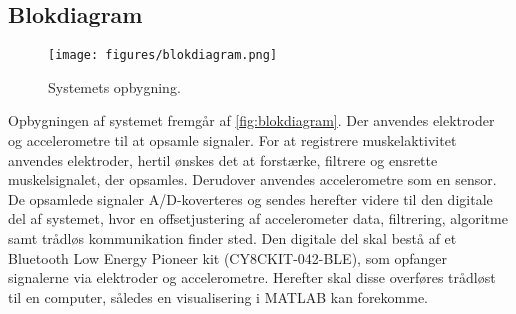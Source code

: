 \subsection{Blokdiagram} \label{sec:blokdiagram} 
\begin{figure}[H]
\centering
\texttt{[image: figures/blokdiagram.png]}
\caption{Systemets opbygning.}
\label{fig:blokdiagram}
\end{figure}

\noindent
Opbygningen af systemet fremgår af \autoref{fig:blokdiagram}. Der anvendes elektroder og accelerometre til at opsamle signaler. 
For at registrere muskelaktivitet anvendes elektroder, hertil ønskes det at forstærke, filtrere og ensrette muskelsignalet, der opsamles. 
Derudover anvendes accelerometre som en sensor.
De opsamlede signaler A/D-koverteres og sendes herefter videre til den digitale del af systemet, hvor en offsetjustering af accelerometer data, filtrering, algoritme samt trådløs kommunikation finder sted. 
Den digitale del skal bestå af et Bluetooth Low Energy Pioneer kit (CY8CKIT-042-BLE), som opfanger signalerne via elektroder og accelerometre. 
Herefter skal disse overføres trådløst til en computer, således en visualisering i MATLAB kan forekomme.

